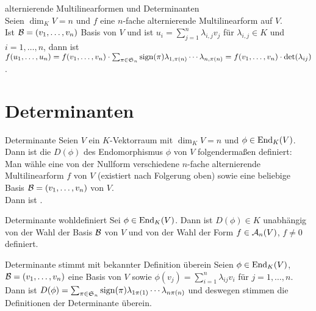 \begin{Satz}{alternierende Multilinearformen und Determinanten} \\
    Seien $\dim_K V = n$ und $f$ eine $n$-fache alternierende Multilinearform
    auf $V$. \\
    Ist $\mathcal{B} = (v_1, \dotsc, v_n)$ Basis von $V$ und ist
    $u_i = \sum_{j=1}^n \lambda_{i,j} v_j$ für $\lambda_{i,j} \in K$ und
    $i = 1, \dotsc, n$, dann ist
    $f(u_1, \dotsc, u_n) = f(v_1, \dotsc, v_n) \cdot
    \sum_{\pi \in \mathfrak{S}_n} \operatorname{sign}(\pi) \lambda_{1,\pi(n)} \dotsm
    \lambda_{n,\pi(n)} = f(v_1, \dotsc, v_n) \cdot \det(\lambda_{ij})$.
\end{Satz}

\section{%
    Determinanten%
}

\begin{Def}{Determinante}
    Seien $V$ ein $K$-Vektorraum mit $\dim_K V = n$ und
    $\phi \in \operatorname{End}_K(V)$. \\
    Dann ist die  $D(\phi)$ des Endomorphismus
    $\phi$ von $V$ folgendermaßen definiert: \\
    Man wähle eine von der Nullform verschiedene $n$-fache alternierende
    Multilinearform $f$ von $V$ (existiert nach Folgerung oben)
    sowie eine beliebige Basis $\mathcal{B} = (v_1, \dotsc, v_n)$ von $V$. \\
    Dann ist .
\end{Def}

\begin{Satz}{Determinante wohldefiniert}
    Sei $\phi \in \operatorname{End}_K(V)$.
    Dann ist $D(\phi) \in K$ unabhängig von der Wahl der Basis $\mathcal{B}$
    von $V$ und von der Wahl der Form $f \in \mathcal{A}_n(V)$, $f \not= 0$
    definiert.
\end{Satz}

\begin{Satz}{Determinante stimmt mit bekannter Definition überein}
    Seien $\phi \in \operatorname{End}_K(V)$, \\
    $\mathcal{B} = (v_1, \dotsc, v_n)$ eine
    Basis von $V$ sowie $\phi(v_j) = \sum_{i=1}^n \lambda_{ij} v_i$
    für $j = 1, \dotsc, n$. \\
    Dann ist $D(\phi) = \sum_{\pi \in \mathfrak{S}_n} \operatorname{sign}(\pi)
    \lambda_{1 \pi(1)} \dotsm \lambda_{n \pi(n)}$
    und deswegen stimmen die Definitionen der Determinante überein.
\end{Satz}

